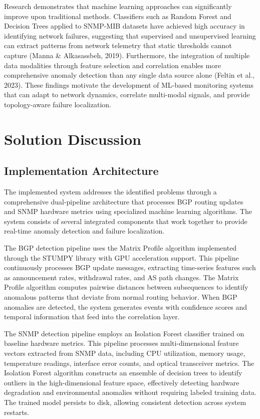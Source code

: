 \documentclass[11pt]{article}
\begin{document}
Research demonstrates that machine learning approaches can significantly improve upon traditional methods. Classifiers such as Random Forest and Decision Trees applied to SNMP-MIB datasets have achieved high accuracy in identifying network failures, suggesting that supervised and unsupervised learning can extract patterns from network telemetry that static thresholds cannot capture (Manna \& Alkasassbeh, 2019). Furthermore, the integration of multiple data modalities through feature selection and correlation enables more comprehensive anomaly detection than any single data source alone (Feltin et al., 2023). These findings motivate the development of ML-based monitoring systems that can adapt to network dynamics, correlate multi-modal signals, and provide topology-aware failure localization.

\section{Solution Discussion}

\subsection{Implementation Architecture}

The implemented system addresses the identified problems through a comprehensive dual-pipeline architecture that processes BGP routing updates and SNMP hardware metrics using specialized machine learning algorithms. The system consists of several integrated components that work together to provide real-time anomaly detection and failure localization.

The BGP detection pipeline uses the Matrix Profile algorithm implemented through the STUMPY library with GPU acceleration support. This pipeline continuously processes BGP update messages, extracting time-series features such as announcement rates, withdrawal rates, and AS path changes. The Matrix Profile algorithm computes pairwise distances between subsequences to identify anomalous patterns that deviate from normal routing behavior. When BGP anomalies are detected, the system generates events with confidence scores and temporal information that feed into the correlation layer.

The SNMP detection pipeline employs an Isolation Forest classifier trained on baseline hardware metrics. This pipeline processes multi-dimensional feature vectors extracted from SNMP data, including CPU utilization, memory usage, temperature readings, interface error counts, and optical transceiver metrics. The Isolation Forest algorithm constructs an ensemble of decision trees to identify outliers in the high-dimensional feature space, effectively detecting hardware degradation and environmental anomalies without requiring labeled training data. The trained model persists to disk, allowing consistent detection across system restarts.
\end{document}
